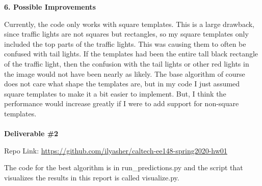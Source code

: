 \documentclass[12pt,letterpaper]{article} \usepackage{fullpage}
\begin{document}
\textbf{6. Possible Improvements}

Currently, the code only works with square templates. This is a large drawback, since
traffic lights are not squares but rectangles, so my square templates only included
the top parts of the traffic lights. This was causing them to often be confused with
tail lights. If the templates had been the entire tall black rectangle of the traffic
light, then the confusion with the tail lights or other red lights in the image would
not have been nearly as likely. The base algorithm of course does not care what shape
the templates are, but in my code I just assumed square templates to make it a bit
easier to implement. But, I think the performance would increase greatly if I were to
add support for non-square templates.\\\\

\textbf{Deliverable \#2}

Repo Link: \url{https://github.com/ilyasher/caltech-ee148-spring2020-hw01}

The code for the best algorithm is in run\_predictions.py and the script
that visualizes the results in this report is called visualize.py.
\end{document}
